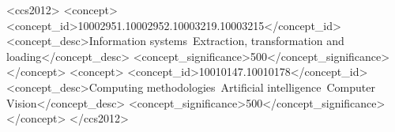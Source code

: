 \documentclass[screen,review]{acmart}
\begin{document}
\begin{abstract}
\end{abstract}

\begin{CCSXML}
<ccs2012>
   <concept>
       <concept_id>10002951.10002952.10003219.10003215</concept_id>
       <concept_desc>Information systems~Extraction, transformation and loading</concept_desc>
       <concept_significance>500</concept_significance>
   </concept>
   <concept>
        <concept_id>10010147.10010178</concept_id>
	<concept_desc>Computing methodologies~Artificial intelligence~Computer Vision</concept_desc>
	<concept_significance>500</concept_significance>
    </concept>
</ccs2012>
\end{CCSXML}

\end{document}
